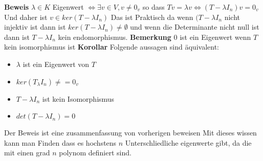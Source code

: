 \documentclass{article}
\begin{document}
\textbf{Beweis} $\lambda \in K$ Eigenwert $\Leftrightarrow \exists v\in V, v\neq 0_v$ so dass $Tv=\lambda v\Leftrightarrow (T-\lambda I_n)v=0_v$ Und daher ist $v\in ker(T-\lambda I_n)$ 
\newline Das ist Praktisch da wenn $(T-\lambda I_n$ nicht injektiv ist dann ist $ker(T-\lambda I_n)\neq \emptyset$ und wenn die Determinante nicht null ist dann ist $T-\lambda I_n$ kein endomorphismus.\newline
\textbf{Bemerkung} 0 ist ein Eigenwert wenn $T$ kein isomorphismus ist\newline
\textbf{Korollar} Folgende aussagen sind äquivalent: \begin{itemize}
\item{$\lambda$ ist ein Eigenwert von $T$}
\item{$ker(T_\lambda I_n)\neq =0_v$}
\item{$T-\lambda I_n$ ist kein Isomorphismus}
\item{$det(T-\lambda I_n)=0$}
\end{itemize}
Der Beweis ist eine zusammenfassung von vorherigen beweisen
\newline Mit dieses wissen kann man Finden dass es hochstens $n$ Unterschliedliche eigenwerte gibt, da die mit einen grad $n$ polynom definiert sind.
\end{document}
